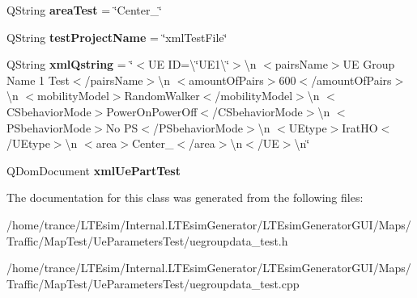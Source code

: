 \begin{DoxyCompactItemize}
\item 
Q\+String {\bfseries area\+Test} = \char`\"{}Center\+\_\char`\"{}\hypertarget{class_u_egroup_data___test_a396d3636221d88201a8bf8ff55324227}{}\label{class_u_egroup_data___test_a396d3636221d88201a8bf8ff55324227}

\item 
Q\+String {\bfseries test\+Project\+Name} = \char`\"{}xml\+Test\+File\char`\"{}\hypertarget{class_u_egroup_data___test_a2ee7abaf321dd7888fc784984f39999f}{}\label{class_u_egroup_data___test_a2ee7abaf321dd7888fc784984f39999f}

\item 
Q\+String {\bfseries xml\+Qstring} = \char`\"{}$<$UE ID=\textbackslash{}\char`\"{}U\+E1\textbackslash{}\char`\"{}$>$\textbackslash{}n $<$pairs\+Name$>$UE Group Name 1 Test$<$/pairs\+Name$>$\textbackslash{}n $<$amount\+Of\+Pairs$>$600$<$/amount\+Of\+Pairs$>$\textbackslash{}n $<$mobility\+Model$>$Random\+Walker$<$/mobility\+Model$>$\textbackslash{}n $<$C\+Sbehavior\+Mode$>$Power\+On\+Power\+Off$<$/C\+Sbehavior\+Mode$>$\textbackslash{}n $<$P\+Sbehavior\+Mode$>$No PS$<$/P\+Sbehavior\+Mode$>$\textbackslash{}n $<$U\+Etype$>$Irat\+HO$<$/U\+Etype$>$\textbackslash{}n $<$area$>$Center\+\_$<$/area$>$\textbackslash{}n$<$/UE$>$\textbackslash{}n\char`\"{}\hypertarget{class_u_egroup_data___test_ac787de40751c17ba7a07b9ab624a83c8}{}\label{class_u_egroup_data___test_ac787de40751c17ba7a07b9ab624a83c8}

\item 
Q\+Dom\+Document {\bfseries xml\+Ue\+Part\+Test}\hypertarget{class_u_egroup_data___test_ada453205af70429909a06b0749729bac}{}\label{class_u_egroup_data___test_ada453205af70429909a06b0749729bac}

\end{DoxyCompactItemize}


The documentation for this class was generated from the following files\+:\begin{DoxyCompactItemize}
\item 
/home/trance/\+L\+T\+Esim/\+Internal.\+L\+T\+Esim\+Generator/\+L\+T\+Esim\+Generator\+G\+U\+I/\+Maps/\+Traffic/\+Map\+Test/\+Ue\+Parameters\+Test/uegroupdata\+\_\+test.\+h\item 
/home/trance/\+L\+T\+Esim/\+Internal.\+L\+T\+Esim\+Generator/\+L\+T\+Esim\+Generator\+G\+U\+I/\+Maps/\+Traffic/\+Map\+Test/\+Ue\+Parameters\+Test/uegroupdata\+\_\+test.\+cpp\end{DoxyCompactItemize}
